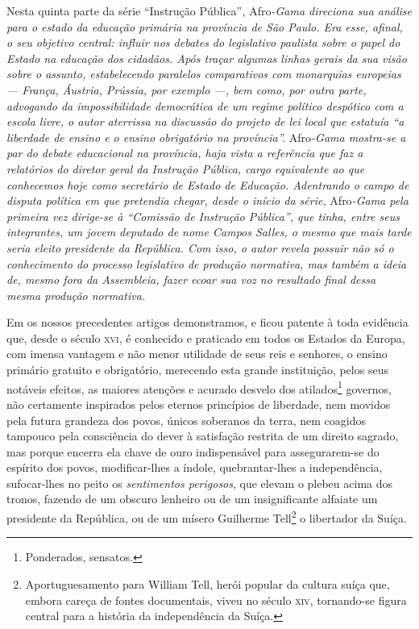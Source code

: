 \begin{didascalia}
Nesta quinta parte da série ``Instrução Pública''\emph{,} Afro\emph{-Gama
direciona sua análise para o estado da educação primária na província de
São Paulo. Era esse, afinal, o seu objetivo central: influir nos debates
do legislativo paulista sobre o papel do Estado na educação dos
cidadãos. Após traçar algumas linhas gerais da sua visão sobre o
assunto, estabelecendo paralelos comparativos com monarquias europeias
--- França, Áustria, Prússia, por exemplo ---, bem como, por outra parte,
advogando da impossibilidade democrática de um regime político despótico
com a escola livre, o autor aterrissa na discussão do projeto de lei
local que estatuía ``a liberdade de ensino e o ensino obrigatório na
província''.} Afro\emph{-Gama mostra-se a par do debate educacional na
província, haja vista a referência que faz a relatórios do diretor geral
da Instrução Pública, cargo equivalente ao que conhecemos hoje como
secretário de Estado de Educação. Adentrando o campo de disputa política
em que pretendia chegar, desde o início da série,} Afro\emph{-Gama pela
primeira vez dirige-se à ``Comissão de Instrução Pública'', que tinha,
entre seus integrantes, um jovem deputado de nome Campos Salles, o mesmo
que mais tarde seria eleito presidente da República. Com isso, o autor
revela possuir não só o conhecimento do processo legislativo de produção
normativa, mas também a ideia de, mesmo fora da Assembleia, fazer ecoar
sua voz no resultado final dessa mesma produção normativa.}
\end{didascalia}



Em os nossos precedentes artigos demonstramos, e ficou patente à toda
evidência que, desde o século \textsc{xvi}, é conhecido e praticado em todos os
Estados da Europa, com imensa vantagem e não menor utilidade de seus
reis e senhores, o ensino primário gratuito e obrigatório, merecendo
esta grande instituição, pelos seus notáveis efeitos, as maiores
atenções e acurado desvelo dos atilados\footnote{Ponderados, sensatos.}
governos, não certamente inspirados pelos eternos princípios de
liberdade, nem movidos pela futura grandeza dos povos, únicos soberanos
da terra, nem coagidos tampouco pela consciência do dever à satisfação
restrita de um direito sagrado, mas porque encerra ela chave de ouro
indispensável para assegurarem-se do espírito dos povos, modificar-lhes
a índole, quebrantar-lhes a independência, sufocar-lhes no peito os
\emph{sentimentos perigosos}, que elevam o plebeu acima dos tronos,
fazendo de um obscuro lenheiro ou de um insignificante alfaiate um
presidente da República, ou de um mísero Guilherme Tell\footnote{
  Aportuguesamento para William Tell, herói popular da cultura suíça
  que, embora careça de fontes documentais, viveu no século \textsc{xiv},
  tornando-se figura central para a história da independência da Suíça.}
o libertador da Suíça.

